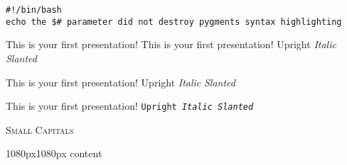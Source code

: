 \documentclass{beamer}
\begin{document}
\begin{frame}
\end{frame}

\begin{frame}[fragile]
\tiny\ttfamily
\begin{lstlisting}
#!/bin/bash
echo the $# parameter did not destroy pygments syntax highlighting
\end{lstlisting}
\end{frame}

\lstset{basicstyle=\footnotesize\ttfamily,breaklines=true}
\begin{frame}
	
\end{frame}


\begin{frame}

    This is your first presentation!
	\newline
    \rmfamily This is your first presentation!
	\newline
	\textup{Upright} \textit{Italic} \textsl{Slanted}
	\newline


    \sffamily This is your first presentation!
	\newline
	\textsf{Upright  \textit{Italic} \textsl{Slanted}}
	\newline

    \ttfamily This is your first presentation!
	\newline
	\texttt{Upright  \textit{Italic} \textsl{Slanted}}
	\newline

	\textsc{Small Capitals}

\end{frame}

\begin{overlayarea}{1080px}{1080px}
  content
\end{overlayarea}
\end{document}
